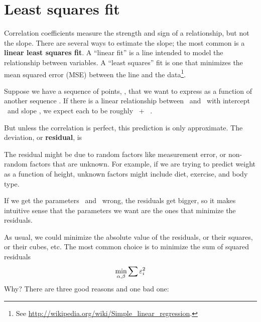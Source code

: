 \documentclass[12pt]{book}
\begin{document}
\section{Least squares fit}

Correlation coefficients measure the strength and sign of a
relationship, but not the slope.  There are several ways to estimate
the slope; the most common is a {\bf linear least squares fit}.  A
``linear fit'' is a line intended to model the relationship between
variables.  A ``least squares'' fit is one that minimizes the mean
squared error (MSE) between the line and the data\footnote{See
  \url{http://wikipedia.org/wiki/Simple_linear_regression}.}.

Suppose we have a sequence of points, \Y, that we want to express as a
function of another sequence \X.  If there is a linear relationship
between \X~and \Y~with intercept \myinter~and slope \myslope, we
expect each \y{} to be roughly \myinter~+ \myslope~\x{}.

But unless the correlation is perfect, this prediction is only
approximate.  The deviation, or {\bf residual}, is 


The residual might be due to random factors like measurement error,
or non-random factors that are unknown.  For example, if we are
trying to predict weight as a function of height, unknown factors
might include diet, exercise, and body type.

If we get the parameters \myinter~and \myslope~wrong, the residuals
get bigger, so it makes intuitive sense that the parameters we want
are the ones that minimize the residuals.

As usual, we could minimize the absolute value of the
residuals, or their squares, or their cubes, etc.  The most common
choice is to minimize the sum of squared residuals
%
\[ \min_{\alpha, \beta} \sum \varepsilon_i^2 \]
%
Why?  There are three good reasons and one bad one:
\end{document}
